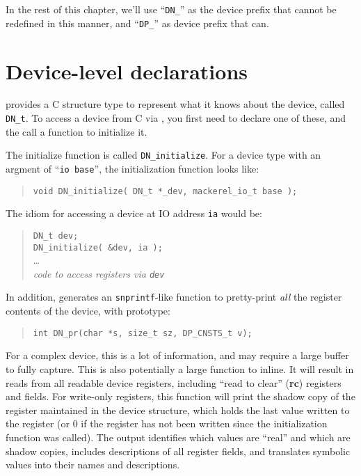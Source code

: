 \documentclass[a4paper,11pt,twoside]{report}
\begin{document}

In the rest of this chapter, we'll use ``\texttt{DN\_}'' as the
device prefix that cannot be redefined in this manner, and ``\texttt{DP\_}''
as device prefix that can. 

\section{Device-level declarations}

\Mac provides a C structure type to represent what it knows about the
device, called \texttt{DN\_t}.  To access a device from C via \Mac,
you first need to declare one of these, and the call a function to
initialize it. 

The initialize function is called \texttt{DN\_initialize}.  For a
device type with an argment of ``\texttt{io base}'', the
initialization function looks like:

\begin{quote}
\texttt{void DN\_initialize( DN\_t *\_dev, mackerel\_io\_t base );}
\end{quote}

The idiom for accessing a device at IO address \texttt{ia} would be:

\begin{quote}
  \texttt{DN\_t dev;}\\
  \texttt{DN\_initialize( \&dev, ia );}\\
  \ldots\\
  \textit{code to access registers via \texttt{dev}}
\end{quote}

In addition, \Mac generates an \texttt{snprintf}-like function to
pretty-print \emph{all} the register contents of the device, with prototype:
\begin{quote}
  \texttt{int DN\_pr(char *s, size\_t sz, DP\_CNSTS\_t v);}
\end{quote}
For a complex device, this is a lot of information, and may require a
large buffer to fully capture.  This is also potentially a large
function to inline.  It will result in reads from all readable device
registers, including ``read to clear'' (\textbf{rc}) registers and
fields.  For write-only registers, this function will print the shadow
copy of the register maintained in the device structure, which holds
the last value written to the register (or 0 if the register has not
been written since the initialization function was called).  The
output identifies which values are ``real'' and which are shadow
copies, includes descriptions of all register fields, and translates
symbolic values into their names and descriptions. 
\end{document}
